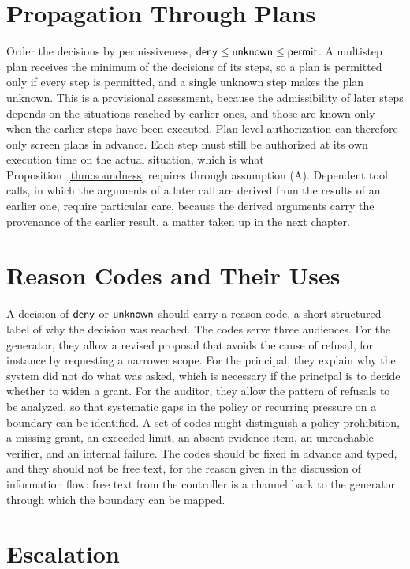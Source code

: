 \section{Propagation Through Plans}

Order the decisions by permissiveness, $\mathsf{deny}\le\mathsf{unknown}\le\mathsf{permit}$. A multistep plan receives the minimum of the decisions of its steps, so a plan is permitted only if every step is permitted, and a single unknown step makes the plan unknown. This is a provisional assessment, because the admissibility of later steps depends on the situations reached by earlier ones, and those are known only when the earlier steps have been executed. Plan-level authorization can therefore only screen plans in advance. Each step must still be authorized at its own execution time on the actual situation, which is what Proposition~\ref{thm:soundness} requires through assumption (A). Dependent tool calls, in which the arguments of a later call are derived from the results of an earlier one, require particular care, because the derived arguments carry the provenance of the earlier result, a matter taken up in the next chapter.

\section{Reason Codes and Their Uses}

A decision of $\mathsf{deny}$ or $\mathsf{unknown}$ should carry a reason code, a short structured label of why the decision was reached. The codes serve three audiences. For the generator, they allow a revised proposal that avoids the cause of refusal, for instance by requesting a narrower scope. For the principal, they explain why the system did not do what was asked, which is necessary if the principal is to decide whether to widen a grant. For the auditor, they allow the pattern of refusals to be analyzed, so that systematic gaps in the policy or recurring pressure on a boundary can be identified. A set of codes might distinguish a policy prohibition, a missing grant, an exceeded limit, an absent evidence item, an unreachable verifier, and an internal failure. The codes should be fixed in advance and typed, and they should not be free text, for the reason given in the discussion of information flow: free text from the controller is a channel back to the generator through which the boundary can be mapped.

\section{Escalation}

